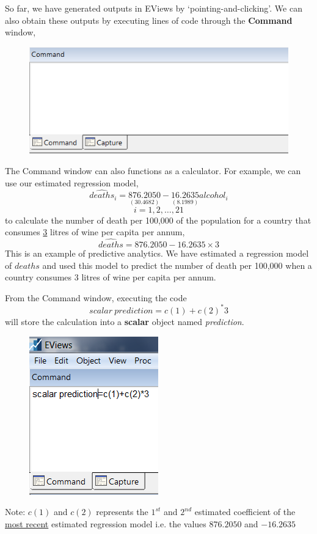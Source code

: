 \documentclass[12pt]{report}
\begin{document}
		\noindent So far, we have generated outputs in EViews by `pointing-and-clicking'. We can also obtain these outputs by executing lines of code through the \textbf{Command} window,
		\begin{figure}[H]
			\centering
			\includegraphics{cmdwin}
		\end{figure}
		\vspace{-\baselineskip}
		\noindent The Command window can also functions as a calculator. For example, we can use our estimated regression model,
		$$\widehat{deaths}_i = \underset{(30.4682)}{876.2050}-\underset{(8.1989)}{16.2635}alcohol_i$$
		$$i = 1, 2, \dots, 21$$
		\noindent to calculate the number of death per 100,000 of the population for a country that consumes \underline{3} litres of wine per capita per annum,
		$$\widehat{deaths} = 876.2050 - 16.2635\times3$$ This is an example of predictive analytics. We have estimated a regression model of $deaths$ and used this model to predict the number of death per 100,000 when a country consumes 3 litres of wine per capita per annum.
		
		\noindent From the Command window, executing the code
		$$scalar\ prediction=c(1)+c(2)^*3$$
		will store the calculation into a \textbf{scalar} object named \textit{prediction}.
		\begin{figure}[H]
			\centering
			\includegraphics{pred1}
		\end{figure}
		\vspace{-\baselineskip}
		\noindent Note: $c(1)$ and $c(2)$ represents the $1^{st}$ and $2^{nd}$ estimated coefficient of the \underline{most recent} estimated regression model i.e. the values $876.2050$ and $-16.2635$
		
\end{document}
